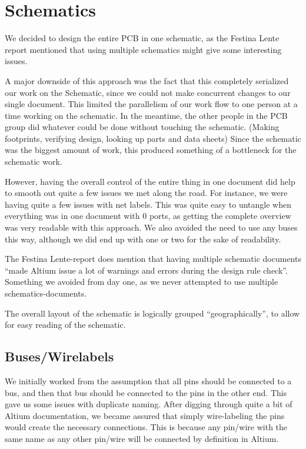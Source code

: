 \section {Schematics}

We decided to design the entire \ac{PCB} in one schematic, as the Festina Lente
report mentioned that using multiple schematics might give
some interesting issues.

A major downside of this approach was the fact that this completely serialized
our work on the Schematic, since we could not make concurrent changes to our
single document. This limited the parallelism of our work flow to one person at a
time working on the schematic.  In the meantime, the other people in the
\ac{PCB} group did whatever could be done without touching the
schematic. (Making footprints, verifying design, looking up parts and data
sheets) Since the schematic was the biggest amount of work, this produced
something of a bottleneck for the schematic work.

However, having the overall control of the entire thing in one document
did help to smooth out quite a few issues we met along the road. For instance,
we were having quite a few issues with net labels. This was quite easy to
untangle when everything was in one document with 0 ports, as getting the
complete overview was very readable with this approach. We also avoided the need
to use any buses this way, although we did end up with one or two for the sake
of readability.

  The
Festina Lente-report does mention that having multiple schematic documents
``made Altium issue a lot of warnings and errors during the design rule
check''\cite[p.~49]{berg2011festinalente}. Something we avoided from day one, as
we never attempted to use multiple schematics-documents. 

The overall layout of the schematic is logically grouped ``geographically'', to
allow for easy reading of the schematic.

\subsection {Buses/Wirelabels}
We initially worked from the assumption that all pins should be connected to a
bus, and then that bus should be connected to the pins in the other end. This
gave us some issues with duplicate naming. After digging through quite a bit of
Altium documentation, we became assured that simply wire-labeling the pins
would create the necessary connections. This is because any pin/wire with the
same name as any other pin/wire will be connected by definition in Altium.

